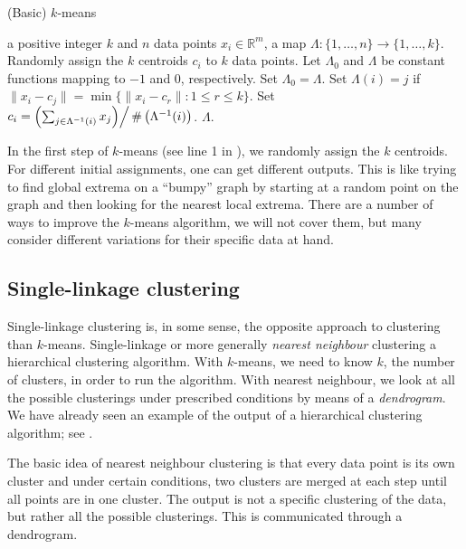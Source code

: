 \documentclass[a4paper, 12pt]{article}
\numberwithin{equation}{section}
\numberwithin{figure}{section}
\theoremstyle{definition}
\renewcommand{\leq}{\leqslant}
\newcommand{\R}{\mathbb{R}}
\begin{document}
\begin{algorithm}
	\caption{(Basic) $k$-means}\label{alg:k-means}
	\begin{algorithmic}[1]
		\Require a positive integer $k$ and $n$ data points $x_i\in\R^m$,
		\Ensure a map $\Lambda : \{1,\dots,n\} \to \{1,\dots, k\}$.
		\State Randomly assign the $k$ centroids $c_i$ to $k$ data points.
		\State Let $\Lambda_0$ and $\Lambda$ be constant functions mapping to $-1$ and $0$, respectively.
		\While{$\Lambda_0 \neq \Lambda$}
			\State Set $\Lambda_0 = \Lambda$.
				\State Set $\Lambda(i) = j$ if $\|x_i-c_j\| = \min\{\|x_i-c_r\| : 1\leq r \leq k\}$.
			\EndFor
				\State Set $c_i = \left(\sum_{j \in \Lambda^{-1}(i)} x_j\middle) \right/ \# \left(\Lambda^{-1}(i)\right)$.
			\EndFor
		\EndWhile
		\State \Return $\Lambda$.
	\end{algorithmic}
\end{algorithm}

In the first step of $k$-means (see line 1 in ), we randomly
assign the $k$ centroids. For different initial assignments, one can get
different outputs. This is like trying to find global extrema on a ``bumpy''
graph by starting at a random point on the graph and then looking for the
nearest local extrema. There are a number of ways to improve the $k$-means
algorithm, we will not cover them, but many consider different variations for
their specific data at hand. 

\subsection{Single-linkage clustering}

Single-linkage clustering is, in some sense, the opposite approach to clustering
than $k$-means. Single-linkage or more generally \emph{nearest neighbour}
clustering a hierarchical clustering algorithm. With $k$-means, we need to know
$k$, the number of clusters, in order to run the algorithm. With nearest
neighbour, we look at all the possible clusterings under prescribed conditions
by means of a \emph{dendrogram}. We have already seen an example of the output
of a hierarchical clustering algorithm; see .

The basic idea of nearest neighbour clustering is that every data point is its
own cluster and under certain conditions, two clusters are merged at each step
until all points are in one cluster. The output is not a specific clustering of
the data, but rather all the possible clusterings. This is communicated through
a dendrogram. 
\end{document}
